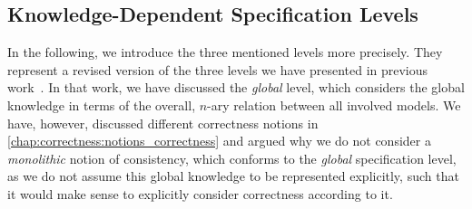 

\subsection{Knowledge-Dependent Specification Levels}

In the following, we introduce the three mentioned levels more precisely.
They represent a revised version of the three levels we have presented in previous work~.
In that work, we have discussed the \emph{global} level, which considers the global knowledge in terms of the overall, $n$-ary relation between all involved models.
We have, however, discussed different correctness notions in \autoref{chap:correctness:notions_correctness} and argued why we do not consider a \emph{monolithic} notion of consistency, which conforms to the \emph{global} specification level, as we do not assume this global knowledge to be represented explicitly, such that it would make sense to explicitly consider correctness according to it.

%    


